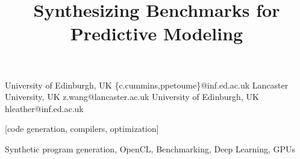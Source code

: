 \makeatletter
\def\@copyrightspace{\relax}
\makeatother

\setlength{\pdfpageheight}{\paperheight}
\setlength{\pdfpagewidth}{\paperwidth}


\title{Synthesizing Benchmarks for Predictive Modeling}
{University of Edinburgh, UK}
{\{c.cummins,ppetoume\}@inf.ed.ac.uk}
{Lancaster University, UK}
{z.wang@lancaster.ac.uk}
{University of Edinburgh, UK}
{hleather@inf.ed.ac.uk}

\maketitle

\begin{abstract}
  
\end{abstract}

[code generation, compilers, optimization]

\keywords
Synthetic program generation, %
OpenCL, %
Benchmarking, %
Deep Learning, %
GPUs
